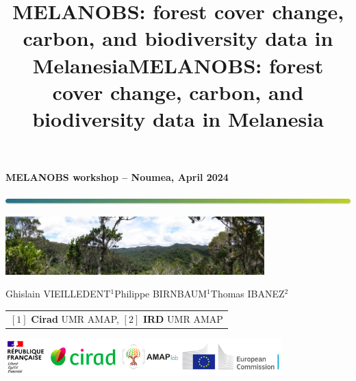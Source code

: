 \documentclass[10pt,table,dvipsnames,compress]{beamer}
\date{}
\title{MELANOBS: forest cover change, carbon, and biodiversity data in Melanesia}
\title[MELANOBS]{MELANOBS: forest cover change, carbon, and biodiversity data in Melanesia}
\begin{document}

{
  \begin{frame}
  \begin{center}
  \small{\textbf{MELANOBS workshop -- Noumea, April 2024}}
  \end{center}
  \vspace{-0.5cm}
  \titlepage %
  \vspace{-3cm}
  \begin{center}
    \includegraphics[width=\textwidth]{figs/Barre_couleur}
    
    \vspace{0.25cm}
    
    \includegraphics[width=10cm]{figs/Banniere}
    
    \small{Ghislain VIEILLEDENT$^{1}$\hspace{0.25cm}Philippe BIRNBAUM$^{1}$\hspace{0.25cm}Thomas IBANEZ$^{2}$}
      
    \vspace{0.25cm}
    
    {\scriptsize
      \begin{tabular}{l}
        $[1]$ \textbf{Cirad} UMR AMAP, $[2]$ \textbf{IRD} UMR AMAP
      \end{tabular}
    }
    
    \includegraphics[width=0.8\textwidth]{figs/partners_logos}
    
  \end{center}
  \end{frame}
}
\end{document}
